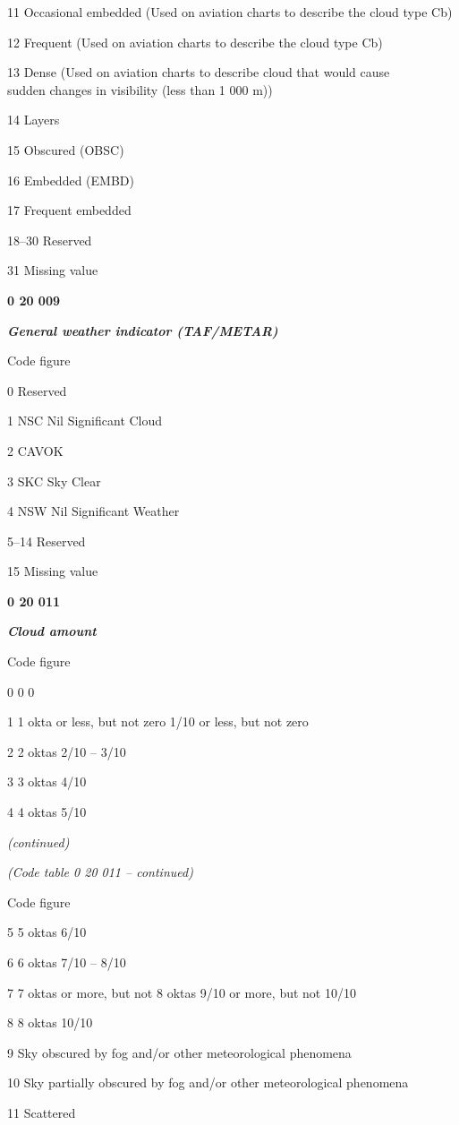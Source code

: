 11 Occasional embedded (Used on aviation charts to describe the cloud type Cb)

12 Frequent (Used on aviation charts to describe the cloud type Cb)

13 Dense (Used on aviation charts to describe cloud that would cause\\
sudden changes in visibility (less than 1 000 m))

14 Layers

15 Obscured (OBSC)

16 Embedded (EMBD)

17 Frequent embedded

18--30 Reserved

31 Missing value

\textbf{0 20 009}

\emph{\textbf{General weather indicator (TAF/METAR)}}

Code figure

0 Reserved

1 NSC Nil Significant Cloud

2 CAVOK

3 SKC Sky Clear

4 NSW Nil Significant Weather

5--14 Reserved

15 Missing value

\textbf{0 20 011}

\emph{\textbf{Cloud amount}}

Code figure

0 0 0

1 1 okta or less, but not zero 1/10 or less, but not zero

2 2 oktas 2/10 -- 3/10

3 3 oktas 4/10

4 4 oktas 5/10

\emph{(continued)}

\emph{(Code table 0 20 011 -- continued)}

Code figure

5 5 oktas 6/10

6 6 oktas 7/10 -- 8/10

7 7 oktas or more, but not 8 oktas 9/10 or more, but not 10/10

8 8 oktas 10/10

9 Sky obscured by fog and/or other meteorological phenomena

10 Sky partially obscured by fog and/or other meteorological phenomena

11 Scattered


